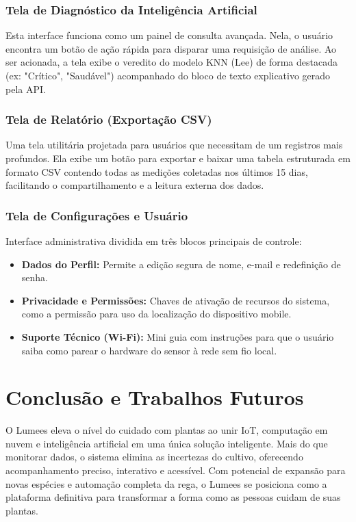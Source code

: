 \documentclass[
	12pt,
	article,
	oneside,
	a4paper,
	english,
	brazil
	]{abntex2}
\begin{document}
\subsubsection{Tela de Diagnóstico da Inteligência Artificial}
Esta interface funciona como um painel de consulta avançada. Nela, o usuário encontra um botão de ação rápida para disparar uma requisição de análise. Ao ser acionada, a tela exibe o veredito do modelo KNN (Lee) de forma destacada (ex: "Crítico", "Saudável") acompanhado do bloco de texto explicativo gerado pela API.

\subsubsection{Tela de Relatório (Exportação CSV)}
Uma tela utilitária projetada para usuários que necessitam de um registros mais profundos. Ela exibe um botão para exportar e baixar uma tabela estruturada em formato CSV contendo todas as medições coletadas nos últimos 15 dias, facilitando o compartilhamento e a leitura externa dos dados.

\subsubsection{Tela de Configurações e Usuário}
Interface administrativa dividida em três blocos principais de controle:
\begin{itemize}
    \item \textbf{Dados do Perfil:} Permite a edição segura de nome, e-mail e redefinição de senha.
    \item \textbf{Privacidade e Permissões:} Chaves de ativação de recursos do sistema, como a permissão para uso da localização do dispositivo mobile.
    \item \textbf{Suporte Técnico (Wi-Fi):} Mini guia com instruções para que o usuário saiba como parear o hardware do sensor à rede sem fio local.
\end{itemize}


\section*{Conclusão e Trabalhos Futuros}
O Lumees eleva o nível do cuidado com plantas ao unir IoT, computação em nuvem e inteligência artificial em uma única solução inteligente. Mais do que monitorar dados, o sistema elimina as incertezas do cultivo, oferecendo acompanhamento preciso, interativo e acessível. Com potencial de expansão para novas espécies e automação completa da rega, o Lumees se posiciona como a plataforma definitiva para transformar a forma como as pessoas cuidam de suas plantas.
\end{document}

